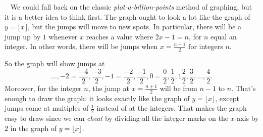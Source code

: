 \begin{Solution}{12.3}
\
\vskip 5pt
We could fall back on the classic {\itshape plot{-}a{-}billion{-}points} method of graphing,
but it is a better idea to think first. The graph ought to look a lot like the graph of $y = \lfloor{x}\rfloor$,
but the jumps will move to new spots. In particular, there will be a jump up by $1$  whenever $x$ reaches a value 
where $2x-1 = n$,
for $n$ equal an integer. In other words, there will be jumps when $x= \frac{n+1}{2}$ for integers $n$.

So the graph will show jumps at 
\[
\ldots, - 2=\frac{-4}{2}, \frac{-3}{2}, -1 = \frac{-2}{2}, \frac{-1}{2}, 0 = \frac{0}{2}, \frac{1}{2}, 1\frac{2}{2}, \frac{3}{2}, \ldots, \frac{4}{2}.
\]
Moreover, for the integer $n$, the jump at $x=\frac{n+1}{2}$ will be from $n-1$ to $n$. That's enough to draw the graph:
it looks exactly like the graph of $y = \lfloor{x}\rfloor$, except jumps come at multiples of $\frac{1}{2}$ instead of at the integers.
That makes the graph easy to draw since we can {\itshape cheat} by dividing all the integer marks on the $x${-}axis by $2$ in the graph of $y = \lfloor {x}\rfloor$.  

\\[5pt]


\end{Solution}

